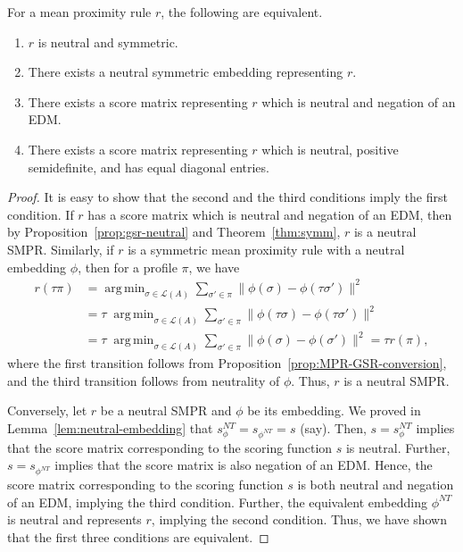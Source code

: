 \documentclass[prodmode,acmec]{ec-acmsmall}
\newcommand{\calL}{{\mathcal{L}}}
\newcommand{\rank}{{\calL(A)}}
\DeclareMathOperator*{\argmin}{arg\,min}
\newcommand{\nt}{NT}
\begin{document}
\begin{theorem}
For a mean proximity rule $r$, the following are equivalent. 
\begin{enumerate}
\item $r$ is neutral and symmetric.
\item There exists a neutral symmetric embedding representing $r$.
\item There exists a score matrix representing $r$ which is neutral and negation of an EDM. 
\item There exists a score matrix representing $r$ which is neutral, positive semidefinite, and has equal diagonal entries.
\end{enumerate}
\label{thm:neutral-smpr}
\end{theorem}
\begin{proof}
It is easy to show that the second and the third conditions imply the first condition. If $r$ has a score matrix which is neutral and negation of an EDM, then by Proposition~\ref{prop:gsr-neutral} and Theorem~\ref{thm:symm}, $r$ is a neutral SMPR. Similarly, if $r$ is a symmetric mean proximity rule with a neutral embedding $\phi$, then for a profile $\pi$, we have 
\begin{align*}
r(\tau \pi) &= \argmin_{\sigma \in \rank} \sum_{\sigma' \in \pi} \|\phi(\sigma)-\phi(\tau \sigma')\|^2 \\
&= \tau \; \argmin_{\sigma \in \rank} \sum_{\sigma' \in \pi} \|\phi(\tau \sigma)-\phi(\tau \sigma')\|^2 \\
&= \tau \; \argmin_{\sigma \in \rank} \sum_{\sigma' \in \pi} \|\phi(\sigma)-\phi(\sigma')\|^2 = \tau r(\pi),
\end{align*}
where the first transition follows from Proposition~\ref{prop:MPR-GSR-conversion}, and the third transition follows from neutrality of $\phi$. Thus, $r$ is a neutral SMPR. 

Conversely, let $r$ be a neutral SMPR and $\phi$ be its embedding. We proved in Lemma~\ref{lem:neutral-embedding} that $s_{\phi}^{\nt} = s_{\phi^{\nt}} = s$ (say). Then, $s = s_{\phi}^{\nt}$ implies that the score matrix corresponding to the scoring function $s$ is neutral. Further, $s = s_{\phi^{\nt}}$ implies that the score matrix is also negation of an EDM. Hence, the score matrix corresponding to the scoring function $s$ is both neutral and negation of an EDM, implying the third condition. Further, the equivalent embedding $\phi^{\nt}$ is neutral and represents $r$, implying the second condition. Thus, we have shown that the first three conditions are equivalent. 


\end{proof}
\end{document}
